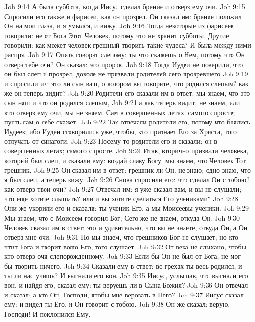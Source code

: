 \vs Joh 9:14 А была суббота, когда Иисус сделал брение и отверз ему очи.
\vs Joh 9:15 Спросили его также и фарисеи, как он прозрел. Он сказал им: брение положил Он на мои глаза, и я умылся, и вижу.
\vs Joh 9:16 Тогда некоторые из фарисеев говорили: не от Бога Этот Человек, потому что не хранит субботы. Другие говорили: как может человек грешный творить такие чудеса? И была между ними распря.
\vs Joh 9:17 Опять говорят слепому: ты что скажешь о Нем, потому что Он отверз тебе очи? Он сказал: это пророк.
\vs Joh 9:18 Тогда Иудеи не поверили, что он был слеп и прозрел, доколе не призвали родителей сего прозревшего
\vs Joh 9:19 и спросили их: это ли сын ваш, о котором вы говорите, что родился слепым? как же он теперь видит?
\vs Joh 9:20 Родители его сказали им в ответ: мы знаем, что это сын наш и что он родился слепым,
\vs Joh 9:21 а как теперь видит, не знаем, или кто отверз ему очи, мы не знаем. Сам в совершенных летах; самого спросте; пусть сам о себе скажет.
\vs Joh 9:22 Так отвечали родители его, потому что боялись Иудеев; ибо Иудеи сговорились уже, чтобы, кто признает Его за Христа, того отлучать от синагоги.
\vs Joh 9:23 Посему-то родители его и сказали: он в совершенных летах; самого спросте.
\vs Joh 9:24 Итак, вторично призвали человека, который был слеп, и сказали ему: воздай славу Богу; мы знаем, что Человек Тот грешник.
\vs Joh 9:25 Он сказал им в ответ: грешник ли Он, не знаю; одно знаю, что я был слеп, а теперь вижу.
\vs Joh 9:26 Снова спросили его: что сделал Он с тобою? как отверз твои очи?
\vs Joh 9:27 Отвечал им: я уже сказал вам, и вы не слушали; что еще хотите слышать? или и вы хотите сделаться Его учениками?
\vs Joh 9:28 Они же укорили его и сказали: ты ученик Его, а мы Моисеевы ученики.
\vs Joh 9:29 Мы знаем, что с Моисеем говорил Бог; Сего же не знаем, откуда Он.
\vs Joh 9:30 Человек  сказал им в ответ: это и удивительно, что вы не знаете, откуда Он, а Он отверз мне очи.
\vs Joh 9:31 Но мы знаем, что грешников Бог не слушает; но кто чтит Бога и творит волю Его, того слушает.
\vs Joh 9:32 От века не слыхано, чтобы кто отверз очи слепорожденному.
\vs Joh 9:33 Если бы Он не был от Бога, не мог бы творить ничего.
\vs Joh 9:34 Сказали ему в ответ: во грехах ты весь родился, и ты ли нас учишь? И выгнали его вон.
\vs Joh 9:35 Иисус, услышав, что выгнали его вон, и найдя его, сказал ему: ты веруешь ли в Сына Божия?
\vs Joh 9:36 Он отвечал и сказал: а кто Он, Господи, чтобы мне веровать в Него?
\vs Joh 9:37 Иисус сказал ему: и видел ты Его, и Он говорит с тобою.
\vs Joh 9:38 Он же сказал: верую, Господи! И поклонился Ему.
